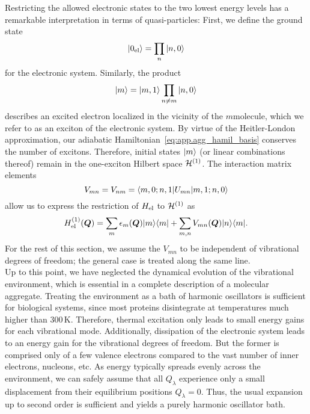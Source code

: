 Restricting the allowed electronic states to the two lowest energy levels has a remarkable interpretation in terms of quasi-particles:
First, we define the ground state
\begin{equation}
  | 0_\mathrm{el} \rangle = \prod_{n} | n, 0 \rangle
  \label{eq:app.ground_state}
\end{equation}
for the electronic system.
Similarly, the product
\begin{equation}
  | m \rangle = | m, 1 \rangle \prod_{n \neq m} | n, 0 \rangle
  \label{eq:app.exciton_state}
\end{equation}
describes an excited electron localized in the vicinity of the $m$\th molecule, which we refer to as an exciton of the electronic system.
By virtue of the Heitler-London approximation, our adiabatic Hamiltonian~\ref{eq:app.agg_hamil_basis} conserves the number of excitons.
Therefore, initial states $| m \rangle$ (or linear combinations thereof) remain in the one-exciton Hilbert space $\mathcal{H}^{(1)}$.
The interaction matrix elements
\begin{equation*}
  V_{mn} = V_{nm} = \langle m, 0; n, 1 | U_{mn} | m, 1; n, 0 \rangle
\end{equation*}
allow us to express the restriction of $H_\mathrm{el}$ to $\mathcal{H}^{(1)}$ as
\begin{equation*}
  H_\mathrm{el}^{(1)}(\boldsymbol{Q}) = \sum_m \epsilon_m(\boldsymbol{Q}) | m \rangle\langle m | + \sum_{m,n} V_{mn}(\boldsymbol{Q}) | n \rangle\langle m |.
\end{equation*}
For the rest of this section, we assume the $V_{mn}$ to be independent of vibrational degrees of freedom; the general case is treated along the same line.\\


Up to this point, we have neglected the dynamical evolution of the vibrational environment, which is essential in a complete description of a molecular aggregate.
Treating the environment as a bath of harmonic oscillators is sufficient for biological systems, since most proteins disintegrate at temperatures much higher than 300\,K.
Therefore, thermal excitation only leads to small energy gains for each vibrational mode.
Additionally, dissipation of the electronic system leads to an energy gain for the vibrational degrees of freedom.
But the former is comprised only of a few valence electrons compared to the vast number of inner electrons, nucleons, etc.
As energy typically spreads evenly across the environment, we can safely assume that all $Q_\lambda$ experience only a small displacement from their equilibrium positions $Q_\lambda = 0$.
Thus, the usual expansion up to second order is sufficient and yields a purely harmonic oscillator bath.

